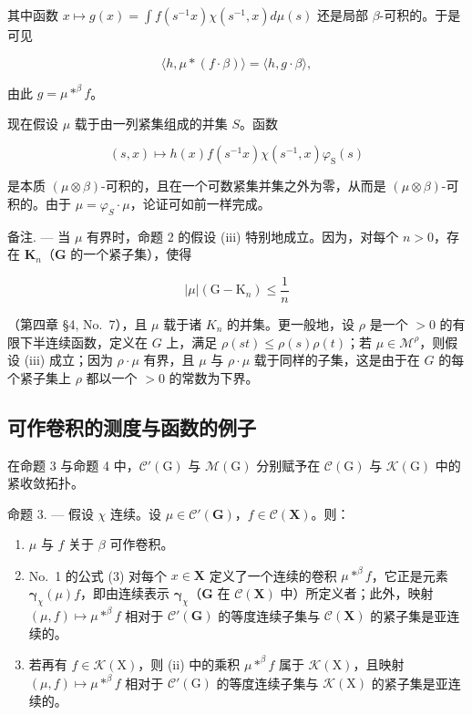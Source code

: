 其中函数 \(x \mapsto g(x) = \int f(s^{-1}x)\chi (s^{-1},x)d\mu (s)\) 还是局部 \(\beta\)-可积的。于是可见

\[
\langle h, \mu * (f \cdot \beta) \rangle = \langle h, g \cdot \beta \rangle ,
\]

由此 \(g = \mu *^{\beta} f\)。

现在假设 \(\mu\) 载于由一列紧集组成的并集 \(S\)。函数

\[
(s, x) \mapsto h (x) f (s ^ {- 1} x) \chi (s ^ {- 1}, x) \varphi_ {\mathrm{S}} (s)
\]

是本质 \((\mu\otimes\beta)\)-可积的，且在一个可数紧集并集之外为零，从而是 \((\mu\otimes\beta)\)-可积的。由于 \(\mu=\varphi_{S}\cdot\mu\)，论证可如前一样完成。

备注. --- 当 \(\mu\) 有界时，命题 2 的假设 (iii) 特别地成立。因为，对每个 \(n > 0\)，存在 \(\mathbf{K}_n\)（\(\mathbf{G}\) 的一个紧子集），使得

\[
| \mu | (\mathrm{G} - \mathrm{K} _ {n}) \leqslant \frac {1}{n}
\]

（第四章 §4, No.~7），且 \(\mu\) 载于诸 \(K_{n}\) 的并集。更一般地，设 \(\rho\) 是一个 \(>0\) 的有限下半连续函数，定义在 \(G\) 上，满足 \(\rho(st) \leqslant \rho(s)\rho(t)\)；若 \(\mu \in \mathcal{M}^{\rho}\)，则假设 (iii) 成立；因为 \(\rho \cdot \mu\) 有界，且 \(\mu\) 与 \(\rho \cdot \mu\) 载于同样的子集，这是由于在 \(G\) 的每个紧子集上 \(\rho\) 都以一个 \(>0\) 的常数为下界。

\subsection{可作卷积的测度与函数的例子}

在命题 3 与命题 4 中，\(\mathcal{C}'(\mathrm{G})\) 与 \(\mathcal{M}(\mathrm{G})\) 分别赋予在 \(\mathcal{C}(\mathrm{G})\) 与 \(\mathcal{K}(\mathrm{G})\) 中的紧收敛拓扑。

命题 3. --- 假设 \(\chi\) 连续。设 \(\mu \in \mathcal{C}'(\mathbf{G})\)，\(f \in \mathcal{C}(\mathbf{X})\)。则：

\begin{enumerate}
\def\labelenumi{(\roman{enumi})}
\item
  \(\mu\) 与 \(f\) 关于 \(\beta\) 可作卷积。
\item
  No.~1 的公式 (3) 对每个 \(x \in \mathbf{X}\) 定义了一个连续的卷积 \(\mu *^{\beta}f\)，它正是元素 \(\pmb{\gamma}_{\chi}(\mu)f\)，即由连续表示 \(\pmb{\gamma}_{\chi}\)（\(\mathbf{G}\) 在 \(\mathcal{C}(\mathbf{X})\) 中）所定义者；此外，映射 \((\mu, f) \mapsto \mu *^{\beta}f\) 相对于 \(\mathcal{C}'(\mathbf{G})\) 的等度连续子集与 \(\mathcal{C}(\mathbf{X})\) 的紧子集是亚连续的。
\item
  若再有 \(f \in \mathcal{K}(\mathrm{X})\)，则 (ii) 中的乘积 \(\mu *^{\beta}f\) 属于 \(\mathcal{K}(\mathrm{X})\)，且映射 \((\mu, f) \mapsto \mu *^{\beta}f\) 相对于 \(\mathcal{C}'(\mathrm{G})\) 的等度连续子集与 \(\mathcal{K}(\mathrm{X})\) 的紧子集是亚连续的。
\end{enumerate}

